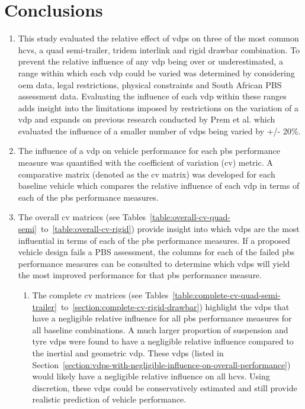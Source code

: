 \chapter{Conclusions}\label{Conclusions} 

\begin{enumerate}

\item This study evaluated the relative effect of \glspl{vdp} on three of the most common \glspl{hcv}, a quad semi-trailer, tridem interlink and rigid drawbar combination. To prevent the relative influence of any \gls{vdp} being over or underestimated, a range within which each \gls{vdp} could be varied was determined by considering \gls{oem} data, legal restrictions, physical constraints and South African PBS assessment data. Evaluating the influence of each \gls{vdp} within these ranges adds insight into the limitations imposed by restrictions on the variation of a \gls{vdp} and expands on previous research conducted by Prem et al. \cite{Prem2002} which evaluated the influence of a smaller number of \glspl{vdp} being varied by +/- 20\%.

\item The influence of a \gls{vdp} on vehicle performance for each \gls{pbs} performance measure was quantified with the coefficient of variation (\gls{cv}) metric. A comparative matrix (denoted as the \gls{cv} matrix) was developed for each baseline vehicle which compares the relative influence of each \gls{vdp} in terms of each of the \gls{pbs} performance measures. 

\item The overall \gls{cv} matrices (see Tables~\ref{table:overall-cv-quad-semi}~to~\ref{table:overall-cv-rigid}) provide insight into which \glspl{vdp} are the most influential in terms of each of the \gls{pbs} performance measures. If a proposed vehicle design fails a PBS assessment, the columns for each of the failed \gls{pbs} performance measures can be consulted to determine which \glspl{vdp} will yield the most improved performance for that \gls{pbs} performance measure.

\begin{enumerate}
\item The complete \gls{cv} matrices (see Tables~\ref{table:complete-cv-quad-semi-trailer}~to~\ref{section:complete-cv-rigid-drawbar}) highlight the \glspl{vdp} that have a negligible relative influence for all \gls{pbs} performance measures for all baseline combinations. A much larger proportion of suspension and tyre \glspl{vdp} were found to have a negligible relative influence compared to the inertial and geometric \gls{vdp}. These \glspl{vdp} (listed in Section~\ref{section:vdps-with-negligible-influence-on-overall-performance}) would likely have a negligible relative influence on all \glspl{hcv}. Using discretion, these \glspl{vdp} could be conservatively estimated and still provide realistic prediction of vehicle performance.


\end{enumerate}
\end{enumerate}
